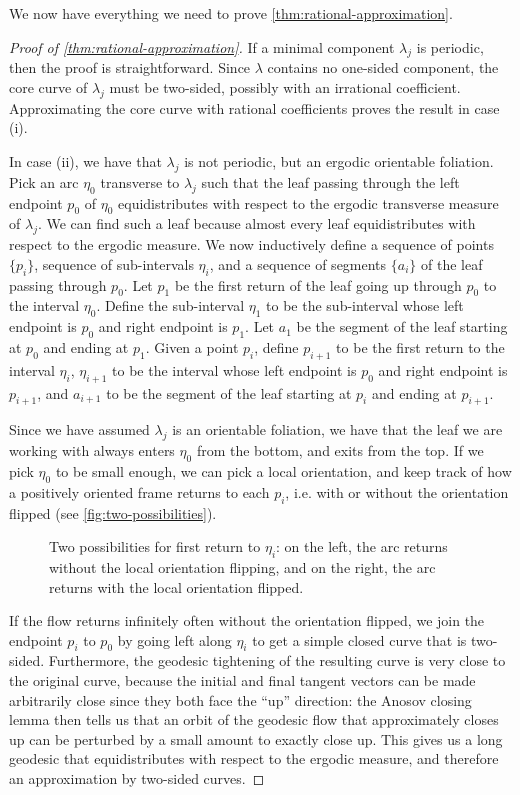 \documentclass[12pt, reqno]{amsart}
\begin{document}
We now have everything we need to prove \autoref{thm:rational-approximation}.
\begin{proof}[Proof of \autoref{thm:rational-approximation}]
  If a minimal component $\lambda_j$ is periodic, then the proof is straightforward.
  Since $\lambda$ contains no one-sided component, the core curve of $\lambda_j$ must be two-sided, possibly with an irrational coefficient.
  Approximating the core curve with rational coefficients proves the result in case (i).

  In case (ii), we have that $\lambda_j$ is not periodic, but an ergodic orientable foliation.
  Pick an arc $\eta_0$ transverse to $\lambda_j$ such that the leaf passing through the left endpoint $p_0$ of $\eta_0$ equidistributes with respect to the ergodic transverse measure of $\lambda_j$.
  We can find such a leaf because almost every leaf equidistributes with respect to the ergodic measure.
  We now inductively define a sequence of points $\{p_i\}$, sequence of sub-intervals $\eta_i$, and a sequence of segments $\{a_i\}$ of the leaf passing through $p_0$.
  Let $p_1$ be the first return of the leaf going up through $p_0$ to the interval $\eta_0$.
  Define the sub-interval $\eta_1$ to be the sub-interval whose left endpoint is $p_0$ and right endpoint is $p_1$.
  Let $a_1$ be the segment of the leaf starting at $p_0$ and ending at $p_1$.
  Given a point $p_i$, define $p_{i+1}$ to be the first return to the interval $\eta_{i}$, $\eta_{i+1}$ to be the interval whose left endpoint is $p_0$ and right endpoint is $p_{i+1}$, and $a_{i+1}$ to be the segment of the leaf starting at $p_i$ and ending at $p_{i+1}$.

  Since we have assumed $\lambda_j$ is an orientable foliation, we have that the leaf we are working with always enters $\eta_0$ from the bottom, and exits from the top.
  If we pick $\eta_0$ to be small enough, we can pick a local orientation, and keep track of how a positively oriented frame returns to each $p_i$, i.e. with or without the orientation flipped (see \autoref{fig:two-possibilities}).
  \begin{figure}[h]
    \centering
    \caption{Two possibilities for first return to $\eta_i$: on the left, the arc returns without the local orientation flipping, and on the right, the arc returns with the local orientation flipped.}
    \label{fig:two-possibilities}
  \end{figure}
  If the flow returns infinitely often without the orientation flipped, we join the endpoint $p_i$ to $p_0$ by going left along $\eta_i$ to get a simple closed curve that is two-sided.
  Furthermore, the geodesic tightening of the resulting curve is very close to the original curve, because the initial and final tangent vectors can be made arbitrarily close since they both face the ``up'' direction: the Anosov closing lemma then tells us that an orbit of the geodesic flow that approximately closes up can be perturbed by a small amount to exactly close up.
  This gives us a long geodesic that equidistributes with respect to the ergodic measure, and therefore an approximation by two-sided curves.


\end{proof}
\end{document}
